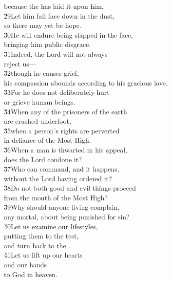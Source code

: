 \begin{poetry}
\poemll    because the  has laid it upon him. \\
\poeml \v{29}Let him fall face down in the dust, \\
\poemll    so there may yet be hope. \\
\poeml \v{30}He will endure being slapped in the face, \\
\poemll    bringing him public disgrace. \\
\poeml \v{31}Indeed, the Lord will not always \\
\poemll    reject us--- \\
\poeml \v{32}though he causes grief, \\
\poemll    his compassion abounds according to his gracious love. \\
\poeml \v{33}For he does not deliberately hurt \\
\poemll    or grieve human beings. \\
\poeml \v{34}When any of the prisoners of the earth \\
\poemll    are crushed underfoot, \\
\poeml \v{35}when a person's rights are perverted \\
\poemll    in defiance of the Most High. \\
\poeml \v{36}When a man is thwarted in his appeal, \\
\poemll    does the Lord condone it? \\
\poeml \v{37}Who can command, and it happens, \\
\poemll    without the Lord having ordered it? \\
\poeml \v{38}Do not both good and evil things proceed \\
\poemll    from the mouth of the Most High? \\
\poeml \v{39}Why should anyone living complain, \\
\poemll    any mortal, about being punished for sin? \\
\poeml \v{40}Let us examine our lifestyles, \\
\poemll    putting them to the test, \\
\poemlll       and turn back to the . \\
\poeml \v{41}Let us lift up our hearts \\
\poemll    and our hands \\
\poemlll       to God in heaven. \\

\end{poetry}
